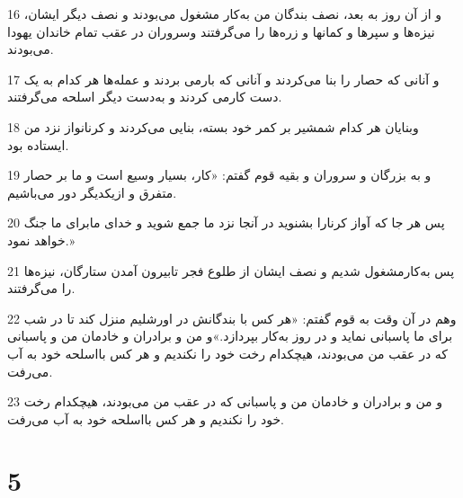 \par 16 و از آن روز به بعد، نصف بندگان من به‌کار مشغول می‌بودند و نصف دیگر ایشان، نیزه‌ها و سپرها و کمانها و زره‌ها را می‌گرفتند وسروران در عقب تمام خاندان یهودا می‌بودند.
\par 17 و آنانی که حصار را بنا می‌کردند و آنانی که بارمی بردند و عمله‌ها هر کدام به یک دست کارمی کردند و به‌دست دیگر اسلحه می‌گرفتند.
\par 18 وبنایان هر کدام شمشیر بر کمر خود بسته، بنایی می‌کردند و کرنانواز نزد من ایستاده بود.
\par 19 و به بزرگان و سروران و بقیه قوم گفتم: «کار، بسیار وسیع است و ما بر حصار متفرق و ازیکدیگر دور می‌باشیم.
\par 20 پس هر جا که آواز کرنارا بشنوید در آنجا نزد ما جمع شوید و خدای مابرای ما جنگ خواهد نمود.»
\par 21 پس به‌کارمشغول شدیم و نصف ایشان از طلوع فجر تابیرون آمدن ستارگان، نیزه‌ها را می‌گرفتند.
\par 22 وهم در آن وقت به قوم گفتم: «هر کس با بندگانش در اورشلیم منزل کند تا در شب برای ما پاسبانی نماید و در روز به‌کار بپردازد.»و من و برادران و خادمان من و پاسبانی که در عقب من می‌بودند، هیچکدام رخت خود را نکندیم و هر کس بااسلحه خود به آب می‌رفت.
\par 23 و من و برادران و خادمان من و پاسبانی که در عقب من می‌بودند، هیچکدام رخت خود را نکندیم و هر کس بااسلحه خود به آب می‌رفت.
 
\chapter{5}

